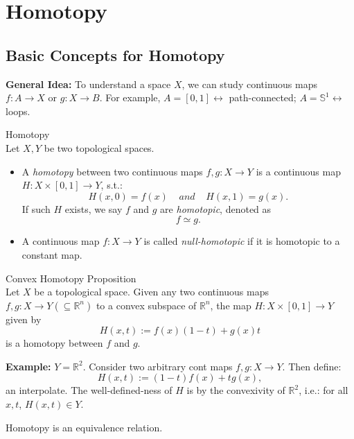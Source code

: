 \chapter{Homotopy}

\section{Basic Concepts for Homotopy}

\noindent\textbf{General Idea:} To understand a space $X$, we can study continuous maps $f: A \rightarrow X$ or $g: X\rightarrow B$. For example, $A = [0,1] \leftrightarrow$ path-connected; $A = \mathbb{S}^1 \leftrightarrow$ loops.

\begin{definition}{Homotopy}\\
Let $X,Y$ be two topological spaces.
\begin{itemize}
    \item A \textit{homotopy} between two continuous maps $f,g :X \rightarrow Y$ is a continuous map $H : X\times [0,1] \rightarrow Y$, s.t.:
    $$H(x,0) = f(x) \;\;\;\;and\;\;\;\;  H(x,1) = g(x).$$
    If such $H$ exists, we say $f$ and $g$ are \textit{homotopic}, denoted as
    $$f \simeq g.$$

    \item A continuous map $f: X \to Y$ is called \textit{null-homotopic} if it is homotopic to a constant map.
\end{itemize}
\end{definition}

\begin{proposition}{Convex Homotopy Proposition}\\
Let $X$ be a topological space. Given any two continuous maps $f,g :X \to Y (\subseteq  \mathbb{R}^n)$ to a convex subspace of $\mathbb{R}^n$, the map $H: X \times [0,1] \to Y$ given by
$$H(x,t) := f(x) (1-t) +g(x) t$$
is a homotopy between $f$ and $g$.
\end{proposition}

\noindent\textbf{Example:} $Y= \mathbb{R}^2$. Consider two arbitrary cont maps $f,g: X \rightarrow Y$. Then define:
$$H(x,t) := (1-t) f(x) + tg(x),$$
an interpolate. The well-defined-ness of $H$ is by the convexivity of $\mathbb{R}^2$, i.e.: for all $x,t$, $H(x,t) \in Y$.

\begin{proposition}
    Homotopy is an equivalence relation.
\end{proposition}

